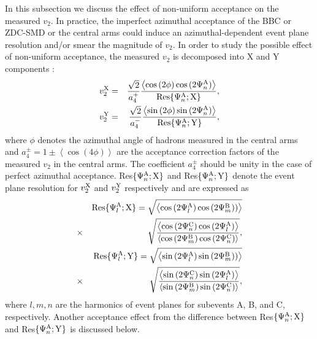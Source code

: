 \documentclass[aps,prc,superscriptaddress,showpacs,floatfix,twocolumn]{revtex4}
\begin{document}
In this subsection we discuss the effect of non-uniform acceptance on the measured $v_2$. 
In practice, the imperfect azimuthal acceptance of the BBC or ZDC-SMD or the central arms
could induce an azimuthal-dependent event plane resolution and/or smear the magnitude of 
$v_2$. In order to study the possible effect of non-uniform acceptance,
the measured $v_2$ is decomposed into X and Y components \cite{Selyuzhenkov:2007zi}:
 \begin{eqnarray}
v_2^{\rm X} & = & \frac{\sqrt{2}}{a^+_4}\frac{\left<\cos{(2\phi)}\cos{(2\Psi_n^{\rm A})}\right>}{{\rm Res}\{\Psi_n^{\rm A};{\rm X}\}}, \nonumber \\ 
v_2^{\rm Y} & = & \frac{\sqrt{2}}{a^-_4}\frac{\left<\sin{(2\phi)}\sin{(2\Psi_n^{\rm A})}\right>}{{\rm Res}\{\Psi_n^{\rm A};{\rm Y}\}},
\label{eq:v2xy}
\end{eqnarray}
where $\phi$ denotes the azimuthal angle of hadrons measured in the central arms 
and $a^{\pm}_4 = 1 \pm \left<\cos{(4\phi)}\right>$ are the acceptance correction factors of the measured 
$v_2$ in the central arms. The coefficient $a_4^{\pm}$ should be unity in the case of perfect azimuthal 
acceptance. Res$\{\Psi_n^{\rm A};{\rm X}\}$ and Res$\{\Psi_n^{\rm A};{\rm Y}\}$ denote the event plane 
resolution for $v_2^{\rm X}$ and $v_2^{\rm Y}$ respectively and are expressed as
\begin{eqnarray}
& & {\rm Res}\{\Psi_l^{\rm A};{\rm X}\} = \sqrt{ \left<\cos{(2\Psi_l^{\rm A})}\cos{(2\Psi_m^{\rm B}))}\right> } \nonumber \\
& \times & \sqrt{\frac{\left<\cos{(2\Psi_n^{\rm C})}\cos{(2\Psi_l^{\rm A})}\right>}{\left<\cos{(2\Psi_m^{\rm B})}\cos{(2\Psi_n^{\rm C})}\right>}}, \nonumber \\
& & {\rm Res}\{\Psi_l^{\rm A};{\rm Y}\} = \sqrt{ \left<\sin{(2\Psi_l^{\rm A})}\sin{(2\Psi_m^{\rm B}))}\right> } \nonumber \\
& \times & \sqrt{\frac{\left<\sin{(2\Psi_n^{\rm C})}\sin{(2\Psi_l^{\rm A})}\right>}{\left<\sin{(2\Psi_m^{\rm B})}\sin{(2\Psi_n^{\rm C})}\right>}},
\label{eq:resolution_xy}
\end{eqnarray}
where $l, m, n$ are the harmonics of event planes for subevents 
A, B, and C, respectively.   Another acceptance effect from the 
difference between Res$\{\Psi_n^{\rm A};{\rm X}\}$ and 
Res$\{\Psi_n^{\rm A};{\rm Y}\}$ is discussed below.
\end{document}
